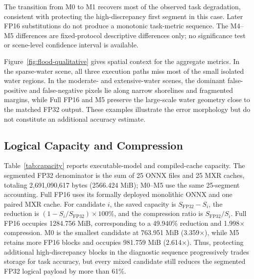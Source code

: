\documentclass[conference]{IEEEtran}
\begin{document}
The transition from M0 to M1 recovers most of the observed task degradation, consistent with protecting the high-discrepancy first segment in this case. Later FP16 substitutions do not produce a monotonic task-metric sequence. The M4--M5 differences are fixed-protocol descriptive differences only; no significance test or scene-level confidence interval is available.

Figure~\ref{fig:flood-qualitative} gives spatial context for the aggregate metrics. In the sparse-water scene, all three execution paths miss most of the small isolated water regions. In the moderate- and extensive-water scenes, the dominant false-positive and false-negative pixels lie along narrow shorelines and fragmented margins, while Full FP16 and M5 preserve the large-scale water geometry close to the matched FP32 output. These examples illustrate the error morphology but do not constitute an additional accuracy estimate.

\subsection{Logical Capacity and Compression}

Table~\ref{tab:capacity} reports executable-model and compiled-cache capacity. The segmented FP32 denominator is the sum of 25 ONNX files and 25 MXR caches, totaling 2,691,090,617 bytes (2566.424 MiB); M0--M5 use the same 25-segment accounting. Full FP16 uses its formally deployed monolithic ONNX and one paired MXR cache. For candidate $i$, the saved capacity is $S_{\mathrm{FP32}}-S_i$, the reduction is $(1-S_i/S_{\mathrm{FP32}})\times100\%$, and the compression ratio is $S_{\mathrm{FP32}}/S_i$. Full FP16 occupies 1284.756 MiB, corresponding to a 49.940\% reduction and 1.998$\times$ compression. M0 is the smallest candidate at 763.951 MiB (3.359$\times$), while M5 retains more FP16 blocks and occupies 981.759 MiB (2.614$\times$). Thus, protecting additional high-discrepancy blocks in the diagnostic sequence progressively trades storage for task accuracy, but every mixed candidate still reduces the segmented FP32 logical payload by more than 61\%.
\end{document}
